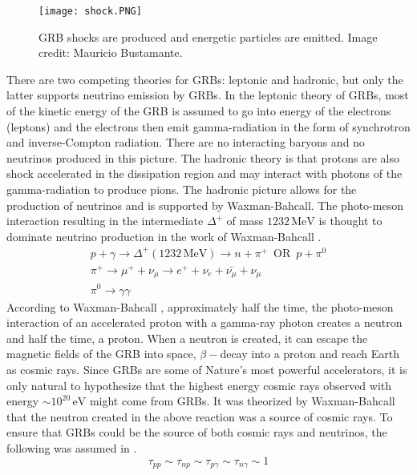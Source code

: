 \documentclass[12pt]{article}
\begin{document}
\begin{doublespace}
\begin{figure}[h]
\centering
\texttt{[image: shock.PNG]}
\caption{GRB shocks are produced and energetic particles are emitted. Image credit: Mauricio Bustamante.}
\label{shock}
\end{figure}
There are two competing theories for GRBs: leptonic and hadronic, but only the latter supports neutrino emission by GRBs. In the leptonic theory of GRBs, most of the kinetic energy of the GRB is assumed to go into energy of the electrons (leptons) and the electrons then emit gamma-radiation in the form of synchrotron and inverse-Compton radiation. There are no interacting baryons and no neutrinos produced in this picture. The hadronic theory is that protons are also shock accelerated in the dissipation region and may interact with photons of the gamma-radiation to produce pions. The hadronic picture allows for the production of neutrinos and is supported by Waxman-Bahcall. The photo-meson interaction resulting in the intermediate $\Delta^+$ of mass $1232 \, \mathrm{MeV}$ is thought to dominate neutrino production in the work of Waxman-Bahcall \cite{Waxmanreview,firstcalc,WBub,afterglows,ubrobust}.
\begin{gather*}
p+\gamma \longrightarrow \Delta^{+} (1232 \, \mathrm{MeV}) \longrightarrow n +\pi^{+} \,\,\, \mathrm{OR} \,\,\, p+\pi^{0}\\
\pi^{+} \longrightarrow \mu^{+} + \nu_{\mu} \longrightarrow e^{+} + \nu_{e} + \bar{\nu_{\mu}} + \nu_{\mu}\\
\pi^{0} \longrightarrow \gamma \gamma
\label{decays}
\end{gather*}
According to Waxman-Bahcall \cite{firstcalc}, approximately half the time, the photo-meson interaction of an accelerated proton with a gamma-ray photon creates a neutron and half the time, a proton. When a neutron is created, it can escape the magnetic fields of the GRB into space, $\beta-$decay into a proton and reach Earth as cosmic rays. Since GRBs are some of Nature's most powerful accelerators, it is only natural to hypothesize that the highest energy cosmic rays observed with energy $\sim 10^{20} \, \mathrm{eV}$ might come from GRBs. It was theorized by Waxman-Bahcall \cite{firstcalc,WBub,afterglows,ubrobust} that the neutron created in the above reaction was a source of cosmic rays. To ensure that GRBs could be the source of both cosmic rays and neutrinos, the following was assumed in \cite{WBub,ubrobust}.
\begin{equation*}
\tau_{pp}\sim \tau_{np} \sim \tau_{p \gamma} \sim \tau_{n \gamma} \sim 1

\end{equation*}
\end{doublespace}
\end{document}
